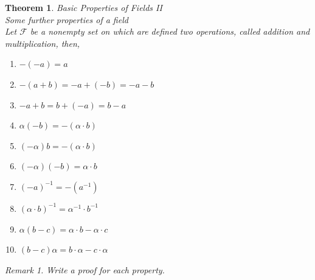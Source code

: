 \documentclass{book}
\newtheorem{theorem}{Theorem}[section]
\theoremstyle{definition}
\theoremstyle{remark}
\newtheorem{remark}{Remark}
\newcommand{\cc}[1]{\mathcal{#1}}
\newcommand{\m}{\cdot}
\begin{document}
\begin{tcolorbox}
    \begin{theorem}
    Basic Properties of Fields II \\
    
        Some further properties of a field\\ 
        
        Let $\cc{F}$ be a nonempty set on which are defined two operations, called addition and multiplication, then, 
            \begin{enumerate}    
                \item $-(- a) = a$
                \item $-(a + b) = - a + (- b) = - a - b$
                \item $- a + b = b + (-a) = b - a$
                \item $\alpha( - b) = - (\alpha \m b)$         
                \item $(- \alpha)b = -(\alpha \m b)$
                \item $(-\alpha)(- b) = \alpha \m b$
                \item $(- a)^{-1} = -({a}^{-1})$
                \item $(\alpha \m b)^{-1} = {\alpha}^{-1} \m {b}^{-1}$
                \item $\alpha (b - c) = \alpha \m b - \alpha \m c$
                \item $(b - c)\alpha = b \m \alpha - c \m \alpha$
            \end{enumerate}    
        
        \begin{remark}
            Write a proof for each property. 
        \end{remark}
        
    \end{theorem}
\end{tcolorbox}
\end{document}
